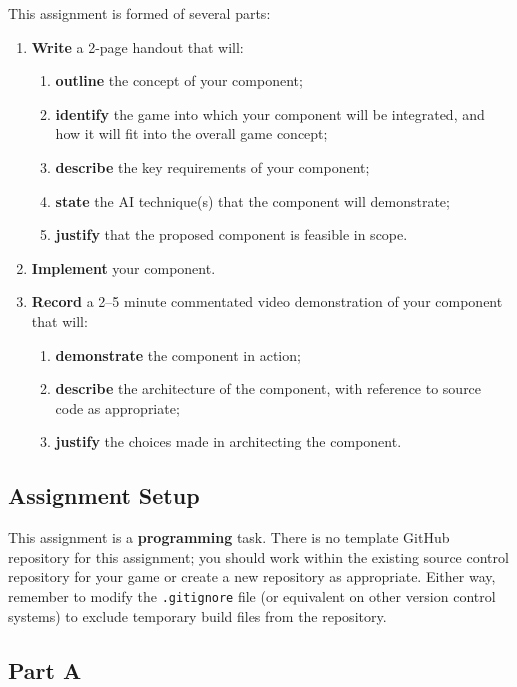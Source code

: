\documentclass{../../fal_assignment}
\begin{document}
This assignment is formed of several parts:
\begin{enumerate}[label=(\Alph*)]
	\item \textbf{Write} a 2-page handout that will:
		\begin{enumerate}[label=(\roman*)]
			\item \textbf{outline} the concept of your component;
			\item \textbf{identify} the game into which your component will be integrated, and how it will fit into
				the overall game concept;
			\item \textbf{describe} the key requirements of your component;
			\item \textbf{state} the AI technique(s) that the component will demonstrate;
			\item \textbf{justify} that the proposed component is feasible in scope.
		\end{enumerate}
	\item \textbf{Implement} your component.
	\item \textbf{Record} a 2--5 minute commentated video demonstration of your component that will:
		\begin{enumerate}[label=(\roman*)]
			\item \textbf{demonstrate} the component in action;
			\item \textbf{describe} the architecture of the component, with reference to source code as appropriate;
			\item \textbf{justify} the choices made in architecting the component.
		\end{enumerate}
\end{enumerate}

\subsection*{Assignment Setup}

This assignment is a \textbf{programming} task.
There is no template GitHub repository for this assignment;
you should work within the existing source control repository for your game
or create a new repository as appropriate.
Either way, remember to modify the \texttt{.gitignore} file (or equivalent on other version control systems) to exclude temporary build files
from the repository.

\subsection*{Part A}
\end{document}
